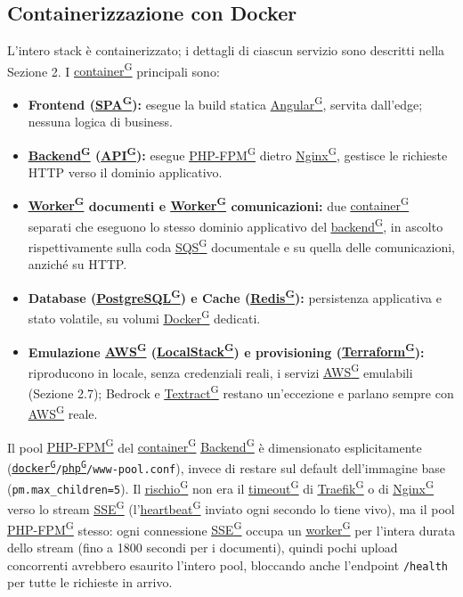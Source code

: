 \documentclass[a4paper,12pt]{article}
\providecommand{\glslink}[2]{\href{https://alittlebyte-19.github.io/Documentazione/glossario.html\#gls-#1}{\underline{#2}\textsuperscript{\scriptsize G}}}
\begin{document}
\subsection{Containerizzazione con Docker}

L'intero stack è containerizzato; i dettagli di ciascun servizio sono descritti nella Sezione 2. I \glslink{container}{container} principali sono:

\begin{itemize}
    \item \textbf{Frontend (\glslink{spa-single-page-application}{SPA}):} esegue la build statica \glslink{angular}{Angular}, servita dall'edge; nessuna logica di business.
    \item \textbf{\glslink{backend}{Backend} (\glslink{api-application-programming-interface}{API}):} esegue \glslink{php-fpm}{PHP-FPM} dietro \glslink{nginx}{Nginx}, gestisce le richieste HTTP verso il dominio applicativo.
    \item \textbf{\glslink{worker}{Worker} documenti e \glslink{worker}{Worker} comunicazioni:} due \glslink{container}{container} separati che eseguono lo stesso dominio applicativo del \glslink{backend}{backend}, in ascolto rispettivamente sulla coda \glslink{sqs-simple-queue-service}{SQS} documentale e su quella delle comunicazioni, anziché su HTTP.
    \item \textbf{Database (\glslink{postgresql}{PostgreSQL}) e Cache (\glslink{redis}{Redis}):} persistenza applicativa e stato volatile, su volumi \glslink{docker}{Docker} dedicati.
    \item \textbf{Emulazione \glslink{aws}{AWS} (\glslink{localstack}{LocalStack}) e provisioning (\glslink{terraform}{Terraform}):} riproducono in locale, senza credenziali reali, i servizi \glslink{aws}{AWS} emulabili (Sezione 2.7); Bedrock e \glslink{textract}{Textract} restano un'eccezione e parlano sempre con \glslink{aws}{AWS} reale.
\end{itemize}

Il pool \glslink{php-fpm}{PHP-FPM} del \glslink{container}{container} \glslink{backend}{Backend} è dimensionato esplicitamente (\texttt{\glslink{docker}{docker}/\allowbreak \glslink{php}{php}/\allowbreak www-pool.conf}), invece di restare sul default dell'immagine base (\texttt{pm.max\_children=5}). Il \glslink{rischio}{rischio} non era il \glslink{timeout}{timeout} di \glslink{traefik}{Traefik} o di \glslink{nginx}{Nginx} verso lo stream \glslink{sse-server-sent-events}{SSE} (l'\glslink{heartbeat}{heartbeat} inviato ogni secondo lo tiene vivo), ma il pool \glslink{php-fpm}{PHP-FPM} stesso: ogni connessione \glslink{sse-server-sent-events}{SSE} occupa un \glslink{worker}{worker} per l'intera durata dello stream (fino a 1800 secondi per i documenti), quindi pochi upload concorrenti avrebbero esaurito l'intero pool, bloccando anche l'endpoint \texttt{/health} per tutte le richieste in arrivo.
\end{document}

